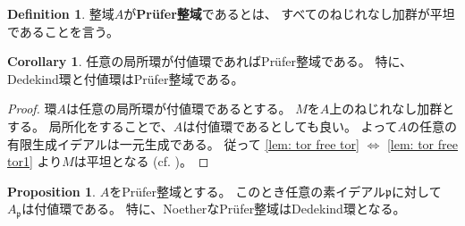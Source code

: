 \documentclass[uplatex]{jsarticle}
\theoremstyle{definition}
\newtheorem{prop}[prop]{Proposition}
\newtheorem{cor}[cor]{Corollary}
\newtheorem{defi}[defi]{Definition}
\theoremstyle{plain}
\newcommand{\dfn}{:\overset{\mathrm{def}}{=}}
\begin{document}
%
%
%




\begin{defi}
  整域\(A\)が\textbf{Pr\"{u}fer整域}であるとは、
  すべてのねじれなし加群が平坦であることを言う。
\end{defi}



\begin{cor}
  任意の局所環が付値環であればPr\"{u}fer整域である。
  特に、Dedekind環と付値環はPr\"{u}fer整域である。
\end{cor}

\begin{proof}
  環\(A\)は任意の局所環が付値環であるとする。
  \(M\)を\(A\)上のねじれなし加群とする。
  局所化をすることで、\(A\)は付値環であるとしても良い。
  よって\(A\)の任意の有限生成イデアルは一元生成である。
  従って
  \ref{lem: tor free tor} \(\Leftrightarrow\) \ref{lem: tor free tor1}
  より\(M\)は平坦となる
  (cf. \cite[演習2.26]{AM})。
\end{proof}


\begin{prop}
  \(A\)をPr\"{u}fer整域とする。
  このとき任意の素イデアル\(\mathfrak{p}\)に対して
  \(A_{\mathfrak{p}}\)は付値環である。
  特に、NoetherなPr\"{u}fer整域はDedekind環となる。
\end{prop}
\end{document}
